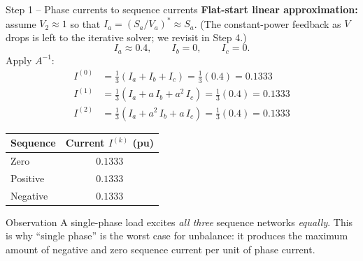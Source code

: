 \documentclass[aspectratio=169,10pt]{beamer}
\begin{document}
\begin{frame}[shrink=5]{Step 1 -- Phase currents to sequence currents}
\textbf{Flat-start linear approximation:} assume $V_2 \approx 1$ so that $I_a = (S_a/V_a)^* \approx S_a$. (The constant-power feedback as $V$ drops is left to the iterative solver; we revisit in Step 4.)
\vspace{0.3em}
\begin{equation*}
I_a \approx 0.4, \qquad I_b = 0, \qquad I_c = 0.
\end{equation*}
Apply $A^{-1}$:
\begin{align*}
I^{(0)} &= \tfrac{1}{3}(I_a + I_b + I_c) = \tfrac{1}{3}(0.4) = 0.1333 \\
I^{(1)} &= \tfrac{1}{3}(I_a + a\,I_b + a^2\,I_c) = \tfrac{1}{3}(0.4) = 0.1333 \\
I^{(2)} &= \tfrac{1}{3}(I_a + a^2\,I_b + a\,I_c) = \tfrac{1}{3}(0.4) = 0.1333
\end{align*}
\vspace{0.2em}
\centering
\small
\begin{tabular}{lc}
\toprule
Sequence & Current $I^{(k)}$ (pu) \\
\midrule
Zero & $0.1333$ \\
Positive & $0.1333$ \\
Negative & $0.1333$ \\
\bottomrule
\end{tabular}
\vspace{0.4em}
\begin{block}{Observation}
A single-phase load excites \emph{all three} sequence networks \emph{equally}. This is why ``single phase'' is the worst case for unbalance: it produces the maximum amount of negative and zero sequence current per unit of phase current.
\end{block}
\end{frame}
\end{document}
